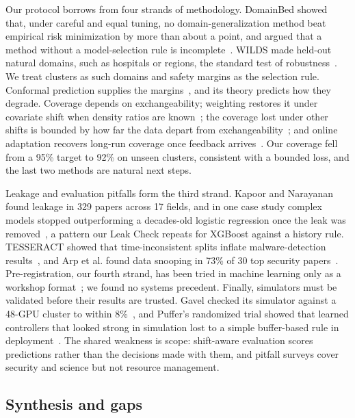 \documentclass[10pt]{article}
\begin{document}
Our protocol borrows from four strands of methodology. DomainBed showed that, under careful and equal tuning, no domain-generalization method beat empirical risk minimization by more than about a point, and argued that a method without a model-selection rule is incomplete~\citep{gulrajani2021search}. WILDS made held-out natural domains, such as hospitals or regions, the standard test of robustness~\citep{koh2021wilds}. We treat clusters as such domains and safety margins as the selection rule. Conformal prediction supplies the margins~\citep{romano2019cqr,angelopoulos2021gentle}, and its theory predicts how they degrade. Coverage depends on exchangeability; weighting restores it under covariate shift when density ratios are known~\citep{tibshirani2019covariate}; the coverage lost under other shifts is bounded by how far the data depart from exchangeability~\citep{barber2023beyond}; and online adaptation recovers long-run coverage once feedback arrives~\citep{gibbs2021adaptive}. Our coverage fell from a 95\% target to 92\% on unseen clusters, consistent with a bounded loss, and the last two methods are natural next steps.

Leakage and evaluation pitfalls form the third strand. Kapoor and Narayanan found leakage in 329 papers across 17 fields, and in one case study complex models stopped outperforming a decades-old logistic regression once the leak was removed~\citep{kapoor2023leakage}, a pattern our Leak Check repeats for XGBoost against a history rule. TESSERACT showed that time-inconsistent splits inflate malware-detection results~\citep{pendlebury2019tesseract}, and Arp et al. found data snooping in 73\% of 30 top security papers~\citep{arp2022dos}. Pre-registration, our fourth strand, has been tried in machine learning only as a workshop format~\citep{bertinetto2020prereg}; we found no systems precedent. Finally, simulators must be validated before their results are trusted. Gavel checked its simulator against a 48-GPU cluster to within 8\%~\citep{narayanan2020gavel}, and Puffer's randomized trial showed that learned controllers that looked strong in simulation lost to a simple buffer-based rule in deployment~\citep{yan2020puffer}. The shared weakness is scope: shift-aware evaluation scores predictions rather than the decisions made with them, and pitfall surveys cover security and science but not resource management.

\subsection{Synthesis and gaps}
\label{sec:rw-gaps}
\end{document}

